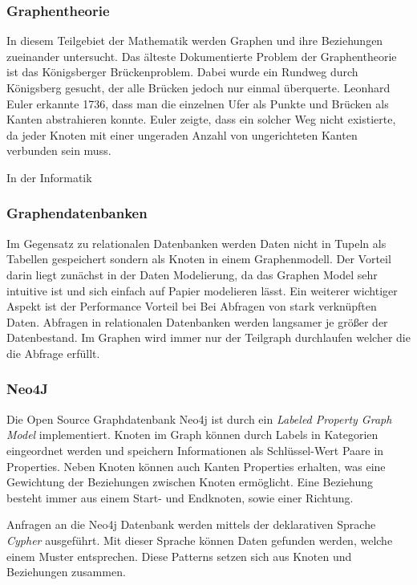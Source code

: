 	\subsubsection{Graphentheorie}
	In diesem Teilgebiet der Mathematik werden Graphen und ihre Beziehungen zueinander untersucht. Das älteste Dokumentierte Problem der Graphentheorie ist das Königsberger Brückenproblem. Dabei wurde ein Rundweg durch Königsberg gesucht, der alle Brücken jedoch nur einmal überquerte. Leonhard Euler erkannte 1736, dass man die einzelnen Ufer als Punkte und Brücken als Kanten abstrahieren konnte. Euler zeigte, dass ein solcher Weg nicht existierte, da jeder Knoten mit einer ungeraden Anzahl von ungerichteten Kanten verbunden sein muss.
	
	In der Informatik 
	\subsubsection{Graphendatenbanken}	
	Im Gegensatz zu relationalen Datenbanken werden Daten nicht in Tupeln als Tabellen gespeichert sondern als Knoten in einem Graphenmodell. Der Vorteil darin liegt zunächst in der Daten Modelierung, da das Graphen Model sehr intuitive ist und sich einfach auf Papier modelieren lässt. 
	Ein weiterer wichtiger Aspekt ist der Performance Vorteil bei Bei Abfragen von stark verknüpften Daten. Abfragen in relationalen Datenbanken werden langsamer je größer der Datenbestand. Im Graphen wird immer nur der Teilgraph durchlaufen welcher die die Abfrage erfüllt.\cite[8]{robinson_webber_eifrem_2015}
	
	\subsubsection{Neo4J}
	
	Die Open Source Graphdatenbank Neo4j ist durch ein \textit{Labeled Property Graph Model} implementiert. Knoten im Graph können durch Labels in Kategorien eingeordnet werden und speichern Informationen als Schlüssel-Wert Paare in Properties. 
	Neben Knoten können auch Kanten Properties erhalten, was eine Gewichtung der Beziehungen zwischen Knoten ermöglicht. Eine Beziehung besteht immer aus einem Start- und Endknoten, sowie einer Richtung.\cite[26]{Robinson2015}
	
	Anfragen an die Neo4j Datenbank werden mittels der deklarativen Sprache \textit{Cypher} ausgeführt. Mit dieser Sprache können Daten gefunden werden, welche einem Muster  entsprechen. Diese Patterns setzen sich aus Knoten und Beziehungen zusammen. 
	
